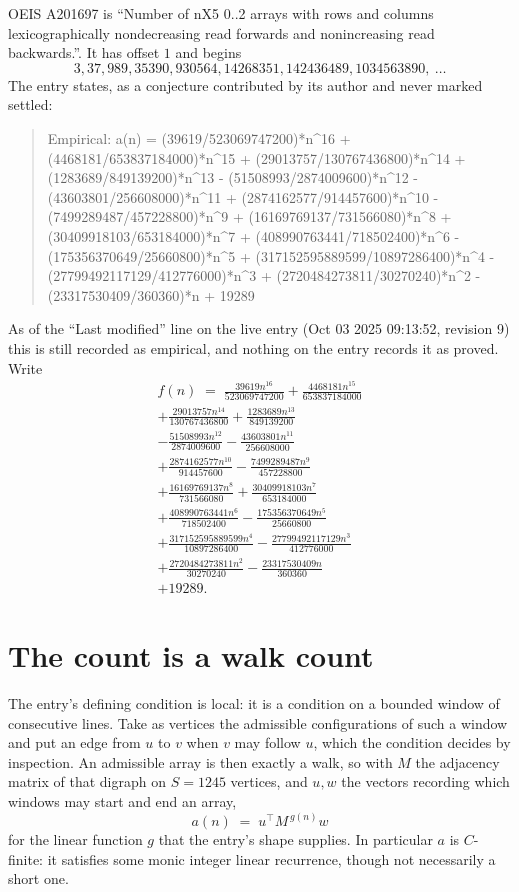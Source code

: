 \documentclass[11pt,a4paper]{article}
\theoremstyle{plain}
\theoremstyle{definition}
\begin{document}
OEIS A201697 is ``Number of nX5 0..2 arrays with rows and columns lexicographically nondecreasing read forwards and nonincreasing read backwards.''. It has offset $1$ and begins
\[
3, 37, 989, 35390, 930564, 14268351, 142436489, 1034563890,\ \dots
\]
The entry states, as a conjecture contributed by its author and never marked settled:
\begin{quote}\raggedright\small
Empirical: a(n) = (39619/523069747200)*n\^{}16 + (4468181/653837184000)*n\^{}15 + (29013757/130767436800)*n\^{}14 + (1283689/849139200)*n\^{}13 - (51508993/2874009600)*n\^{}12 - (43603801/256608000)*n\^{}11 + (2874162577/914457600)*n\^{}10 - (7499289487/457228800)*n\^{}9 + (16169769137/731566080)*n\^{}8 + (30409918103/653184000)*n\^{}7 + (408990763441/718502400)*n\^{}6 - (175356370649/25660800)*n\^{}5 + (317152595889599/10897286400)*n\^{}4 - (27799492117129/412776000)*n\^{}3 + (2720484273811/30270240)*n\^{}2 - (23317530409/360360)*n + 19289
\end{quote}
As of the ``Last modified'' line on the live entry (Oct 03 2025 09:13:52, revision 9) this is still
recorded as empirical, and nothing on the entry records it as proved. Write
\begin{multline*}
f(n)\;=\;\frac{39619 n^{16}}{523069747200} + \frac{4468181 n^{15}}{653837184000} \\
+ \frac{29013757 n^{14}}{130767436800} + \frac{1283689 n^{13}}{849139200} \\
- \frac{51508993 n^{12}}{2874009600} - \frac{43603801 n^{11}}{256608000} \\
+ \frac{2874162577 n^{10}}{914457600} - \frac{7499289487 n^{9}}{457228800} \\
+ \frac{16169769137 n^{8}}{731566080} + \frac{30409918103 n^{7}}{653184000} \\
+ \frac{408990763441 n^{6}}{718502400} - \frac{175356370649 n^{5}}{25660800} \\
+ \frac{317152595889599 n^{4}}{10897286400} - \frac{27799492117129 n^{3}}{412776000} \\
+ \frac{2720484273811 n^{2}}{30270240} - \frac{23317530409 n}{360360} \\
+ 19289.
\end{multline*}

\section{The count is a walk count}

The entry's defining condition is local: it is a condition on a bounded window of consecutive lines. Take as vertices the
admissible configurations of such a window and put an edge from $u$ to $v$ when $v$ may
follow $u$, which the condition decides by inspection. An admissible array is then exactly a
walk, so with $M$ the adjacency matrix of that digraph on $S=1245$ vertices, and $u,w$ the
vectors recording which windows may start and end an array,
\[
a(n)\;=\;u^{\!\top}M^{\,g(n)}w
\]
for the linear function $g$ that the entry's shape supplies. In particular $a$ is
$C$-finite: it satisfies some monic integer linear recurrence, though not necessarily a short
one.
\end{document}

